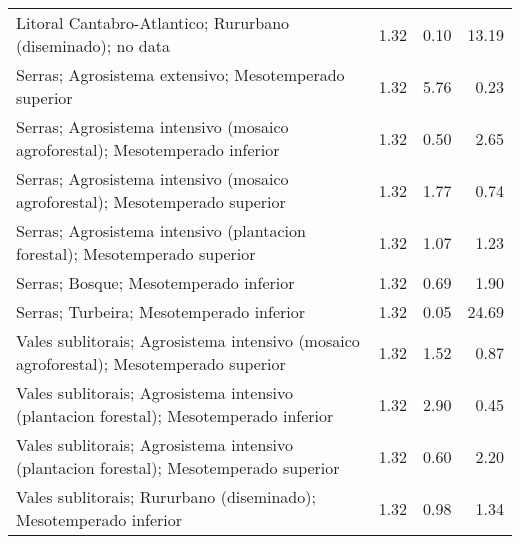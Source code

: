 \begin{table}[p]
\begin{tabular}{lrrr}
  Litoral Cantabro-Atlantico; Rururbano (diseminado); no data & 1.32 & 0.10 & 13.19 \\ 
  Serras; Agrosistema extensivo; Mesotemperado superior & 1.32 & 5.76 & 0.23 \\ 
  Serras; Agrosistema intensivo (mosaico agroforestal); Mesotemperado inferior & 1.32 & 0.50 & 2.65 \\ 
  Serras; Agrosistema intensivo (mosaico agroforestal); Mesotemperado superior & 1.32 & 1.77 & 0.74 \\ 
  Serras; Agrosistema intensivo (plantacion forestal); Mesotemperado superior & 1.32 & 1.07 & 1.23 \\ 
  Serras; Bosque; Mesotemperado inferior & 1.32 & 0.69 & 1.90 \\ 
  Serras; Turbeira; Mesotemperado inferior & 1.32 & 0.05 & 24.69 \\ 
  Vales sublitorais; Agrosistema intensivo (mosaico agroforestal); Mesotemperado superior & 1.32 & 1.52 & 0.87 \\ 
  Vales sublitorais; Agrosistema intensivo (plantacion forestal); Mesotemperado inferior & 1.32 & 2.90 & 0.45 \\ 
  Vales sublitorais; Agrosistema intensivo (plantacion forestal); Mesotemperado superior & 1.32 & 0.60 & 2.20 \\ 
  Vales sublitorais; Rururbano (diseminado); Mesotemperado inferior & 1.32 & 0.98 & 1.34 \\ 
   \hline
\end{tabular}
\end{table}
